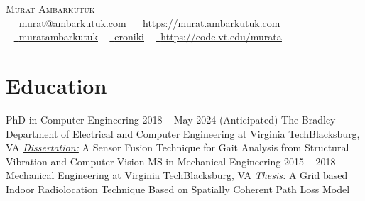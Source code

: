\documentclass[letterpaper,11pt]{article}
\begin{document}
\nocite{ambarkutuk2023}
\nocite{ambarkutuk2021uncertainty}
\nocite{sa2021investigation}
\nocite{sa2020towards}
\nocite{ambarkutuk2017grid}
\nocite{ocak2015image}
\nocite{guner2015meslek}
\nocite{guner2014distance}
\nocite{guner2013magnetic}

\begin{center}
    {\Huge \scshape Murat Ambarkutuk} \\ \vspace{1pt}
	~ \href{mailto:murat@ambarkutuk.com}{\raisebox{-0.2\height}\faEnvelope\  \underline{murat@ambarkutuk.com}}
	~ \href{https://murat.ambarkutuk.com}{\raisebox{-0.2\height}\faBookmark\  \underline{https://murat.ambarkutuk.com}} \\
    ~ \href{https://linkedin.com/in/muratambarkutuk/}{\raisebox{-0.2\height}\faLinkedin\ \underline{muratambarkutuk}}
	~ \href{https://github.com/eroniki}{\raisebox{-0.2\height}\faGithub\ \underline{eroniki}}
	~ \href{https://code.vt.edu/murata}{\raisebox{-0.2\height}\faGitlab\ \underline{https://code.vt.edu/murata}}
	\vspace{-8pt}
\end{center}

\section{Education}
  \resumeSubHeadingListStart
    \resumeSubheading
      {PhD in Computer Engineering}
	  {2018 -- May 2024 (Anticipated)}
      {The Bradley Department of Electrical and Computer Engineering at Virginia Tech}{Blacksburg, VA}
		\vspace{-2ex}
		\resumeItemListStart
	    \resumeItemListEnd
	  \textit{\underline{Dissertation:}} A Sensor Fusion Technique for Gait Analysis from Structural Vibration and Computer Vision 
	  \resumeSubheading
      {MS in Mechanical Engineering}
	  {2015 -- 2018}
      {Mechanical Engineering at Virginia Tech}{Blacksburg, VA}
	  \textit{\underline{Thesis:}} A Grid based Indoor Radiolocation Technique Based on Spatially Coherent Path Loss Model
	  
\end{document}
